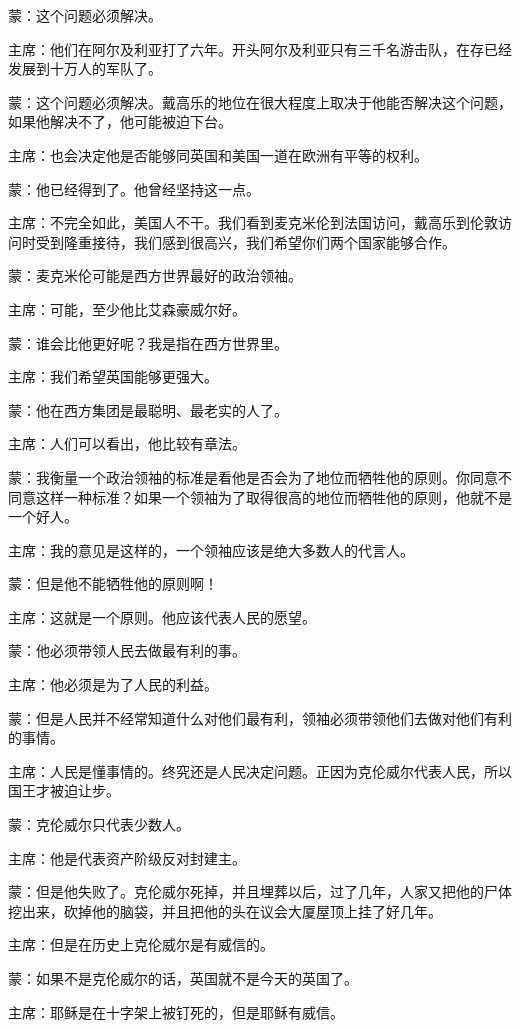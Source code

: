 蒙：这个问题必须解决。

主席：他们在阿尔及利亚打了六年。开头阿尔及利亚只有三千名游击队，在存已经发展到十万人的军队了。

蒙：这个问题必须解决。戴高乐的地位在很大程度上取决于他能否解决这个问题，如果他解决不了，他可能被迫下台。

主席：也会决定他是否能够同英国和美国一道在欧洲有平等的权利。

蒙：他已经得到了。他曾经坚持这一点。

主席：不完全如此，美国人不干。我们看到麦克米伦到法国访问，戴高乐到伦敦访问时受到隆重接待，我们感到很高兴，我们希望你们两个国家能够合作。

蒙：麦克米伦可能是西方世界最好的政治领袖。

主席：可能，至少他比艾森豪威尔好。

蒙：谁会比他更好呢？我是指在西方世界里。

主席：我们希望英国能够更强大。

蒙：他在西方集团是最聪明、最老实的人了。

主席：人们可以看出，他比较有章法。

蒙：我衡量一个政治领袖的标准是看他是否会为了地位而牺牲他的原则。你同意不同意这样一种标准？如果一个领袖为了取得很高的地位而牺牲他的原则，他就不是一个好人。

主席：我的意见是这样的，一个领袖应该是绝大多数人的代言人。

蒙：但是他不能牺牲他的原则啊！

主席：这就是一个原则。他应该代表人民的愿望。

蒙：他必须带领人民去做最有利的事。

主席：他必须是为了人民的利益。

蒙：但是人民并不经常知道什么对他们最有利，领袖必须带领他们去做对他们有利的事情。

主席：人民是懂事情的。终究还是人民决定问题。正因为克伦威尔代表人民，所以国王才被迫让步。

蒙：克伦威尔只代表少数人。

主席：他是代表资产阶级反对封建主。

蒙：但是他失败了。克伦威尔死掉，并且埋葬以后，过了几年，人家又把他的尸体挖出来，砍掉他的脑袋，并且把他的头在议会大厦屋顶上挂了好几年。

主席：但是在历史上克伦威尔是有威信的。

蒙：如果不是克伦威尔的话，英国就不是今天的英国了。

主席：耶稣是在十字架上被钉死的，但是耶稣有威信。

